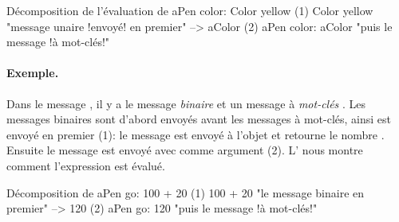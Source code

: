 \documentclass[a4paper,10pt,twoside]{book}
\begin{document}
\begin{example}[decColor]{D\'ecomposition de l'\'evaluation de }{}
        aPen color: Color yellow
(1)                       Color yellow        "message unaire !envoy\'e! en premier"
                        --> aColor
(2)   aPen color: aColor                 "puis le message !\`a mot-cl\'es!"
\end{example}

\paragraph{Exemple.} Dans le message , il y a le message \emph{binaire}  et un message \`a \emph{mot-cl\'es} . Les messages binaires sont d'abord envoy\'es avant les messages \`a mot-cl\'es, ainsi  est envoy\'e en premier (1): le message  est envoy\'e \`a l'objet  et retourne le nombre . Ensuite le message  est envoy\'e avec comme argument  (2).
L' nous montre comment l'expression est \'evalu\'e. 

\begin{example}[decGo]{D\'ecomposition de }{}
      aPen go: 100 + 20   
(1)                 100 + 20           "le message binaire en premier"
                   -->   120
(2)  aPen go: 120                   "puis le message !\`a mot-cl\'es!"
\end{example}
\end{document}
